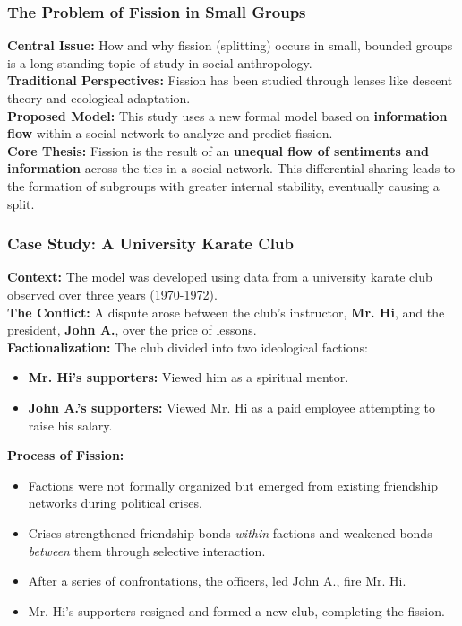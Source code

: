 \documentclass{article}
\begin{document}
    \subsubsection{The Problem of Fission in Small Groups}

    \noindent \textbf{Central Issue:} How and why fission (splitting) occurs
in small, bounded groups is a long-standing topic of study in social
anthropology.\\

    \noindent \textbf{Traditional Perspectives:} Fission has been studied
through lenses like descent theory and ecological adaptation. \\

    \noindent \textbf{Proposed Model:} This study uses a new formal model
based on \textbf{information flow} within a social network to analyze and
predict fission.\\

    \noindent \textbf{Core Thesis:} Fission is the result of an
\textbf{unequal flow of sentiments and information} across the ties in a
social network. This differential sharing leads to the formation of
subgroups with greater internal stability, eventually causing a split.

    \subsubsection{Case Study: A University Karate Club}

    \noindent \textbf{Context:} The model was developed using data from a
university karate club observed over three years (1970-1972).\\

    \noindent \textbf{The Conflict:} A dispute arose between the club's
instructor, \textbf{Mr. Hi}, and the president, \textbf{John A.}, over the
price of lessons.\\

    \noindent \textbf{Factionalization:} The club divided into two
ideological factions:
    \begin{itemize}
        \item \textbf{Mr. Hi's supporters:} Viewed him as a spiritual mentor.
        \item \textbf{John A.'s supporters:} Viewed Mr. Hi as a paid
        employee attempting to raise his salary.
    \end{itemize}

    \noindent \textbf{Process of Fission:}
    \begin{itemize}
        \item Factions were not formally organized but emerged from existing
        friendship networks during political crises.
        \item Crises strengthened friendship bonds \textit{within} factions
        and weakened bonds \textit{between} them through selective interaction.
        \item After a series of confrontations, the officers, led John A.,
        fire Mr. Hi.
        \item Mr. Hi's supporters resigned and formed a new club, completing
        the fission.
    \end{itemize}
\end{document}
